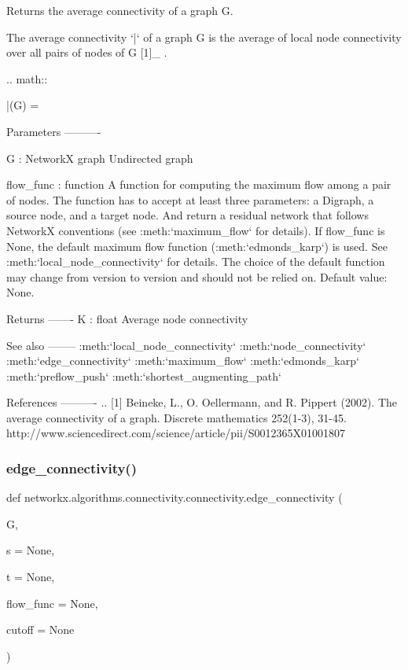 \begin{DoxyVerb}Returns the average connectivity of a graph G.

The average connectivity `\bar{\kappa}` of a graph G is the average
of local node connectivity over all pairs of nodes of G [1]_ .

.. math::

    \bar{\kappa}(G) = 

Parameters
----------

G : NetworkX graph
    Undirected graph

flow_func : function
    A function for computing the maximum flow among a pair of nodes.
    The function has to accept at least three parameters: a Digraph,
    a source node, and a target node. And return a residual network
    that follows NetworkX conventions (see :meth:`maximum_flow` for
    details). If flow_func is None, the default maximum flow function
    (:meth:`edmonds_karp`) is used. See :meth:`local_node_connectivity`
    for details. The choice of the default function may change from
    version to version and should not be relied on. Default value: None.

Returns
-------
K : float
    Average node connectivity

See also
--------
:meth:`local_node_connectivity`
:meth:`node_connectivity`
:meth:`edge_connectivity`
:meth:`maximum_flow`
:meth:`edmonds_karp`
:meth:`preflow_push`
:meth:`shortest_augmenting_path`

References
----------
.. [1]  Beineke, L., O. Oellermann, and R. Pippert (2002). The average
        connectivity of a graph. Discrete mathematics 252(1-3), 31-45.
        http://www.sciencedirect.com/science/article/pii/S0012365X01001807\end{DoxyVerb}
 \mbox{\label{namespacenetworkx_1_1algorithms_1_1connectivity_1_1connectivity_afdb56b224f01fa955db4b6223c1074af}} 
\subsubsection{\texorpdfstring{edge\+\_\+connectivity()}{edge\_connectivity()}}
{\footnotesize\ttfamily def networkx.\+algorithms.\+connectivity.\+connectivity.\+edge\+\_\+connectivity (\begin{DoxyParamCaption}\item[{}]{G,  }\item[{}]{s = {\ttfamily None},  }\item[{}]{t = {\ttfamily None},  }\item[{}]{flow\+\_\+func = {\ttfamily None},  }\item[{}]{cutoff = {\ttfamily None} }\end{DoxyParamCaption})}

